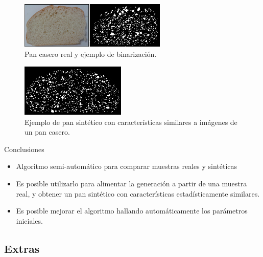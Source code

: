 \documentclass[spanish,unknownkeysallowed]{beamer}
\begin{document}
\begin{frame}

\begin{figure}
\begin{center}
\includegraphics[width=7cm]{../figures/realbin2}
\caption{ Pan casero real y ejemplo de binarización.}
\label{realbin2}
\end{center}
\end{figure}

\begin{figure}
\begin{center}
\includegraphics[width=5cm]{../figures/best2}
\caption{Ejemplo de pan sintético con características similares a imágenes de un pan casero.}
\label{best2}
\end{center}
\end{figure}
\end{frame}



\begin{frame}{Conclusiones}
\begin{block}{}
\begin{itemize}
\item Algoritmo semi-automático para comparar muestras reales y sintéticas
\item Es posible utilizarlo para alimentar la generación a partir de una muestra real, y obtener un pan sintético con características estadísticamente similares.
\item Es posible mejorar el algoritmo hallando automáticamente los parámetros iniciales.
\end{itemize}
\end{block}

\end{frame}

\subsection{Extras}
\end{document}
